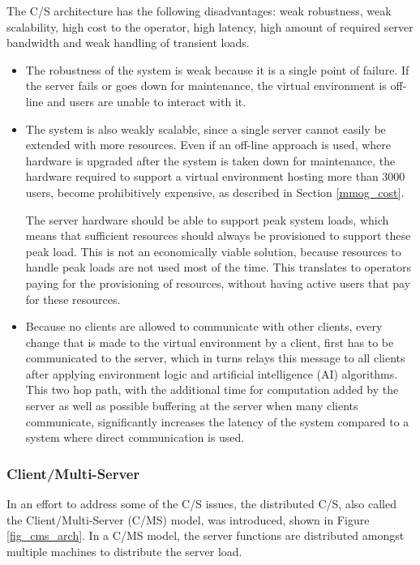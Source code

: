 The C/S architecture has the following disadvantages: weak robustness, weak scalability, high cost to the operator, high latency, high amount of required server bandwidth and weak handling of transient loads.
\begin{itemize}
\item The robustness of the system is weak because it is a single point of failure. If the server fails or goes down for maintenance, the virtual environment is off-line and users are unable to interact with it.

\item The system is also weakly scalable, since a single server cannot easily be extended with more resources. Even if an off-line approach is used, where hardware is upgraded after the system is taken down for maintenance, the hardware required to support a virtual environment hosting more than 3000 users, become prohibitively expensive, as described in Section \ref{mmog_cost}.

The server hardware should be able to support peak system loads, which means that sufficient resources should always be provisioned to support these peak load. This is not an economically viable solution, because resources to handle peak loads are not used most of the time. This translates to operators paying for the provisioning of resources, without having active users that pay for these resources.

\item Because no clients are allowed to communicate with other clients, every change that is made to the virtual environment by a client, first has to be communicated to the server, which in turns relays this message to all clients after applying environment logic and artificial intelligence (AI) algorithms. This two hop path, with the additional time for computation added by the server as well as possible buffering at the server when many clients communicate, significantly increases the latency of the system compared to a system where direct communication is used.
\end{itemize}

\subsubsection{Client/Multi-Server}

In an effort to address some of the C/S issues, the distributed C/S, also called the Client/Multi-Server (C/MS) model, was introduced, shown in Figure \ref{fig_cms_arch}. In a C/MS model,
the server functions are distributed amongst multiple machines to distribute the server load.

